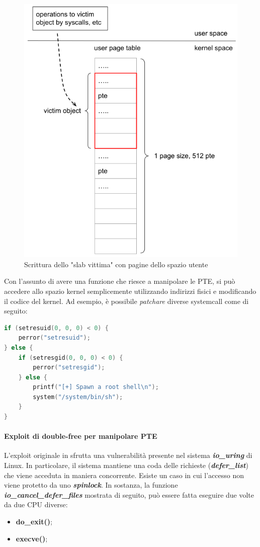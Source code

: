 \documentclass{article}
\begin{document}
\begin{figure}[h]
  \begin{center}
    \includegraphics[width=.5\textwidth]{figures/ch1/pic1_occupy_with_pagetable.png}
  \end{center}
  \caption{Scrittura dello "slab vittima" con pagine dello spazio utente}\label{fig:occupy-dpt}
\end{figure}
Con l'assunto di avere una funzione che riesce a manipolare le PTE, si può accedere 
allo spazio kernel semplicemente utilizzando indirizzi fisici e modificando il codice del kernel. 
Ad esempio, è possibile \textit{patchare} diverse systemcall come di seguito:


\begin{lstlisting}[language=C,style=CStyle,caption="Privilege escalation con system call modificate dall'attacco"]
if (setresuid(0, 0, 0) < 0) {
    perror("setresuid");
} else {
    if (setresgid(0, 0, 0) < 0) {
        perror("setresgid");
    } else {
        printf("[+] Spawn a root shell\n");
        system("/system/bin/sh");
    }
}
\end{lstlisting}

\paragraph{Exploit di double-free per manipolare PTE} L'exploit originale in \cite{DirtyPageTable}
sfrutta una vulnerabilità presente nel sistema \textbf{\textit{io\_uring}} di Linux. 
In particolare, il sistema mantiene una coda delle richieste (\textbf{\textit{defer\_list}}) 
che viene acceduta in maniera concorrente. Esiste un caso in cui l'accesso non viene protetto 
da uno \textbf{\textit{spinlock}}. In sostanza, la funzione \textbf{\textit{io\_cancel\_defer\_files}} 
mostrata di seguito, può essere fatta eseguire due volte da due CPU diverse:
\begin{itemize}
  \item \textbf{do\_exit()};
  \item \textbf{execve()};
\end{itemize}
\end{document}
